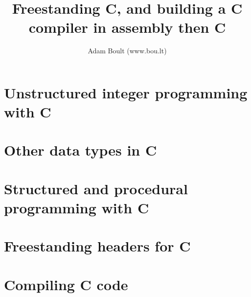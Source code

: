 \documentclass[oneside]{book}
\begin{document}
\author{Adam Boult (www.bou.lt)}
\title{Freestanding C, and building a C compiler in assembly then C}
\maketitle

\setcounter{tocdepth}{0}
\tableofcontents



\part{Unstructured integer programming with C}











\part{Other data types in C}






\part{Structured and procedural programming with C}








\part{Freestanding headers for C}











\part{Compiling C code}

\end{document}
